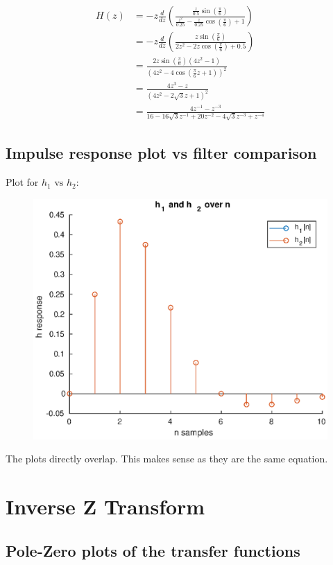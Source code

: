 \documentclass{article}
\begin{document}
\begin{align*}
	H(z) & = -z \frac{d}{dz}\left( \frac{\frac{z}{0.5} \sin \left(\frac{\pi}{6}\right)}{\frac{z^2}{0.25}-\frac{z}{0.25} \cos \left(\frac{\pi}{6}\right) + 1} \right) \\
	     & = -z \frac{d}{dz}\left( \frac{z\sin\left(\frac{\pi}{6}\right)}{2z^2-2z \cos\left(\frac{\pi}{6}\right) + 0.5} \right)                                      \\
	     & = \frac{2 z \sin(\frac{\pi}{6})(4z^2-1)}{{(4z^2-4\cos(\frac{\pi}{6} z + 1))}^2}                                                                           \\
	     & = \frac{4 z^3 -z}{{(4z^2 - 2 \sqrt{3} z + 1)}^2}                                                                                                          \\
	     & = \frac{4 z^{-1} - z^{-3}}{16 - 16 \sqrt{3} z^{-1} + 20 z^{-2} - 4 \sqrt{3} z^{-3} + z^{-4}}
\end{align*}


\subsection{Impulse response plot vs filter comparison}
Plot for \(h_1 \text{ vs } h_2\):

\begin{figure}[H]
	\centering
	\includegraphics[width=0.4\linewidth]{h1h2}
\end{figure}

The plots directly overlap. This makes sense as they are the same equation.

\section{Inverse Z Transform}
\subsection{Pole-Zero plots of the transfer functions}
\end{document}
